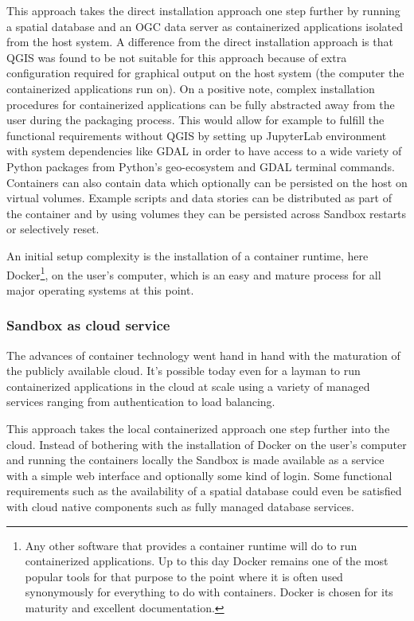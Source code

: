 \documentclass[11pt, a4paper, oneside, parskip=full-]{scrartcl}
\begin{document}
This approach takes the direct installation approach one step further by running
a spatial database and an OGC data server as containerized applications isolated
from the host system. A difference from the direct installation approach is that
QGIS was found to be not suitable for this approach because of extra
configuration required for graphical output on the host system (the computer the
containerized applications run on). On a positive note, complex installation
procedures for containerized applications can be fully abstracted away from the
user during the packaging process. This would allow for example to fulfill the
functional requirements without QGIS by setting up JupyterLab environment with
system dependencies like GDAL in order to have access to a wide variety of
Python packages from Python's geo-ecosystem and GDAL terminal commands.
Containers can also contain data which optionally can be persisted on the host
on virtual volumes. Example scripts and data stories can be distributed as part
of the container and by using volumes they can be persisted across Sandbox
restarts or selectively reset.

An initial setup complexity is the installation of a container runtime, here
Docker\footnote{Any other software that provides a container runtime will do to
run containerized applications. Up to this day Docker remains one of the most
popular tools for that purpose to the point where it is often used synonymously
for everything to do with containers. Docker is chosen for its maturity and
excellent documentation.}, on the user's computer, which is an easy and mature
process for all major operating systems at this point.

\subsubsection*{Sandbox as cloud service}
The advances of container technology went hand in hand with the maturation of
the publicly available cloud. It's possible today even for a layman to run
containerized applications in the cloud at scale using a variety of managed
services ranging from authentication to load balancing.

This approach takes the local containerized approach one step further into the
cloud. Instead of bothering with the installation of Docker on the user's
computer and running the containers locally the Sandbox is made available as a
service with a simple web interface and optionally some kind of login. Some
functional requirements such as the availability of a spatial database could
even be satisfied with cloud native components such as fully managed database
services.
\end{document}
